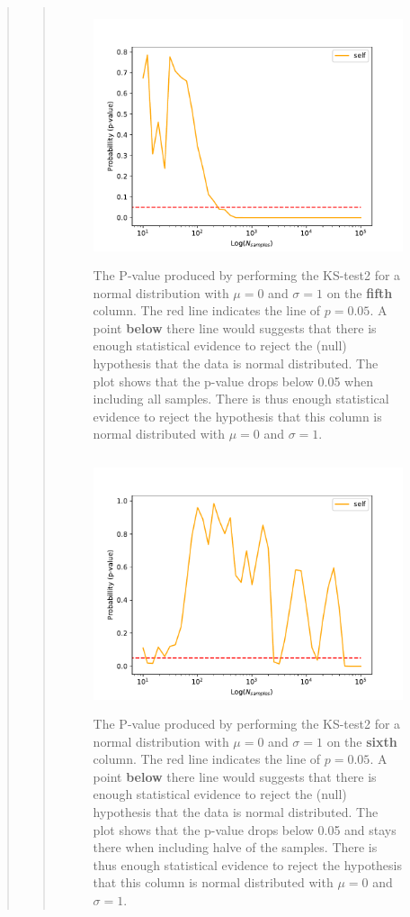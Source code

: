 \begin{quote}
\begin{quote}
\begin{figure}[!ht]
\centering
\includegraphics[width=12cm, height=7.5cm]{./Plots/1e_plot_column_4.pdf}
\caption{The P-value produced by performing the KS-test2 for a normal distribution with $\mu = 0$ and $\sigma = 1$ on the \textbf{fifth} column.  The red line indicates the line of $ p = 0.05$. A point \textbf{below} there  line would suggests that there is enough statistical evidence to reject the (null) hypothesis that the data is normal distributed. The plot shows that the p-value drops below 0.05 when including all samples. There is thus enough statistical evidence to reject the hypothesis that this column is normal distributed with $\mu = 0$ and $\sigma = 1$.}
\end{figure}


\begin{figure}[!ht]
\centering
\includegraphics[width=12cm, height=7.5cm]{./Plots/1e_plot_column_5.pdf}
\caption{The P-value produced by performing the KS-test2 for a normal distribution with $\mu = 0$ and $\sigma = 1$ on the \textbf{sixth} column.  The red line indicates the line of $ p = 0.05$. A point \textbf{below} there  line would suggests that there is enough statistical evidence to reject the (null) hypothesis that the data is normal distributed. The plot shows that the p-value drops below 0.05 and stays there when including halve of the samples.  There is thus enough statistical evidence to reject the hypothesis that this column is normal distributed with $\mu = 0$ and $\sigma = 1$.}
\end{figure}


\end{quote}
\end{quote}
